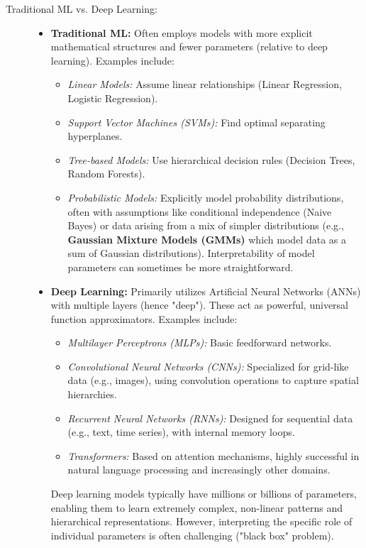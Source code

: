 \documentclass{article}
\begin{document}
\begin{description}
    \item[Traditional ML vs. Deep Learning:]
        \begin{itemize}
            \item \textbf{Traditional ML:} Often employs models with more explicit mathematical structures and fewer parameters (relative to deep learning). Examples include:
                \begin{itemize}
                    \item \textit{Linear Models:} Assume linear relationships (Linear Regression, Logistic Regression).
                    \item \textit{Support Vector Machines (SVMs):} Find optimal separating hyperplanes.
                    \item \textit{Tree-based Models:} Use hierarchical decision rules (Decision Trees, Random Forests).
                    \item \textit{Probabilistic Models:} Explicitly model probability distributions, often with assumptions like conditional independence (Naive Bayes) or data arising from a mix of simpler distributions (e.g., \textbf{Gaussian Mixture Models (GMMs)} which model data as a sum of Gaussian distributions). Interpretability of model parameters can sometimes be more straightforward.
                \end{itemize}
            \item \textbf{Deep Learning:} Primarily utilizes Artificial Neural Networks (ANNs) with multiple layers (hence "deep"). These act as powerful, universal function approximators. Examples include:
                \begin{itemize}
                    \item \textit{Multilayer Perceptrons (MLPs):} Basic feedforward networks.
                    \item \textit{Convolutional Neural Networks (CNNs):} Specialized for grid-like data (e.g., images), using convolution operations to capture spatial hierarchies.
                    \item \textit{Recurrent Neural Networks (RNNs):} Designed for sequential data (e.g., text, time series), with internal memory loops.
                    \item \textit{Transformers:} Based on attention mechanisms, highly successful in natural language processing and increasingly other domains.
                \end{itemize}
            Deep learning models typically have millions or billions of parameters, enabling them to learn extremely complex, non-linear patterns and hierarchical representations. However, interpreting the specific role of individual parameters is often challenging ("black box" problem).
        \end{itemize}
\end{description}
\end{document}

